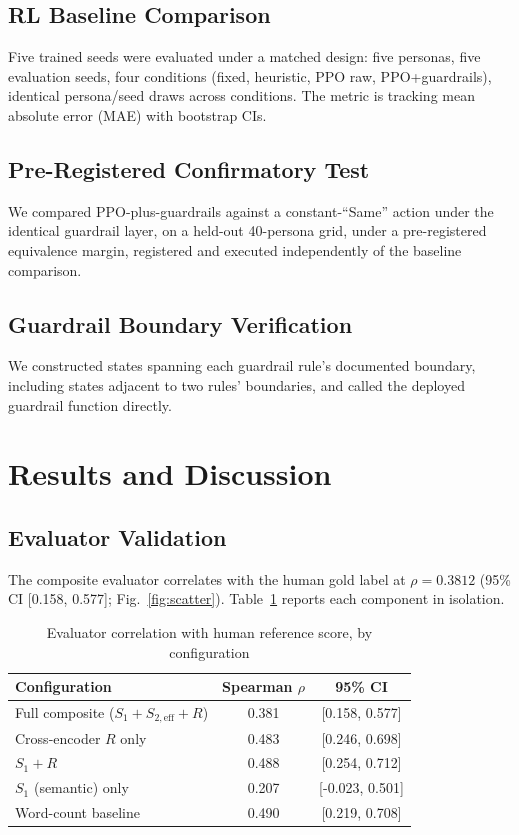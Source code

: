 \documentclass[conference]{IEEEtran}
\begin{document}
\subsection{RL Baseline Comparison}
Five trained seeds were evaluated under a matched design: five personas, five evaluation seeds, four conditions (fixed, heuristic, PPO raw, PPO+guardrails), identical persona/seed draws across conditions. The metric is tracking mean absolute error (MAE) with bootstrap CIs.

\subsection{Pre-Registered Confirmatory Test}
We compared PPO-plus-guardrails against a constant-``Same'' action under the identical guardrail layer, on a held-out 40-persona grid, under a pre-registered equivalence margin, registered and executed independently of the baseline comparison.

\subsection{Guardrail Boundary Verification}
We constructed states spanning each guardrail rule's documented boundary, including states adjacent to two rules' boundaries, and called the deployed guardrail function directly.

\section{Results and Discussion}

\subsection{Evaluator Validation}
\label{sec:evalresults}

The composite evaluator correlates with the human gold label at $\rho = 0.3812$ (95\% CI [0.158, 0.577]; Fig.~\ref{fig:scatter}). Table~\ref{tab:eval} reports each component in isolation.

\begin{table}[t]
\caption{Evaluator correlation with human reference score, by configuration}
\label{tab:eval}
\centering
\begin{tabular}{lcc}
\toprule
Configuration & Spearman $\rho$ & 95\% CI \\
\midrule
Full composite ($S_1{+}S_{2,\mathrm{eff}}{+}R$) & 0.381 & [0.158, 0.577] \\
Cross-encoder $R$ only & 0.483 & [0.246, 0.698] \\
$S_1 + R$ & 0.488 & [0.254, 0.712] \\
$S_1$ (semantic) only & 0.207 & [-0.023, 0.501] \\
Word-count baseline & 0.490 & [0.219, 0.708] \\
\bottomrule
\end{tabular}
\end{table}
\end{document}
